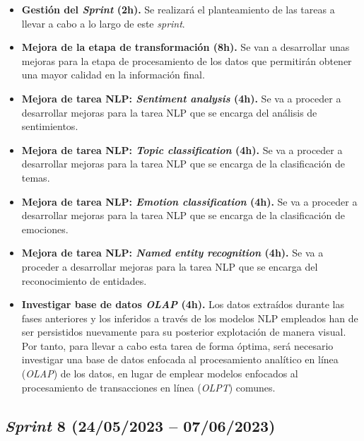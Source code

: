\begin{itemize}

    \item \textbf{Gestión del \textit{Sprint} (2h).} Se realizará el planteamiento de las tareas a llevar a cabo a lo largo de este \textit{sprint}.

    \item \textbf{Mejora de la etapa de transformación (8h).} Se van a desarrollar unas mejoras para la etapa de procesamiento de los datos que permitirán obtener una mayor calidad en la información final.

    \item \textbf{Mejora de tarea NLP: \textit{Sentiment analysis} (4h).} Se va a proceder a desarrollar mejoras para la tarea NLP que se encarga del análisis de sentimientos.

    \item \textbf{Mejora de tarea NLP: \textit{Topic classification} (4h).} Se va a proceder a desarrollar mejoras para la tarea NLP que se encarga de la clasificación de temas.

    \item \textbf{Mejora de tarea NLP: \textit{Emotion classification} (4h).} Se va a proceder a desarrollar mejoras para la tarea NLP que se encarga de la clasificación de emociones.

    \item \textbf{Mejora de tarea NLP: \textit{Named entity recognition} (4h).} Se va a proceder a desarrollar mejoras para la tarea NLP que se encarga del reconocimiento de entidades.

    \item \textbf{Investigar base de datos \textit{OLAP} (4h).} Los datos extraídos durante las fases anteriores y los inferidos a través de los modelos NLP empleados han de ser persistidos nuevamente para su posterior explotación de manera visual. Por tanto, para llevar a cabo esta tarea de forma óptima, será necesario investigar una base de datos enfocada al procesamiento analítico en línea (\textit{OLAP}) de los datos, en lugar de emplear modelos enfocados al procesamiento de transacciones en línea (\textit{OLPT}) comunes.

\end{itemize}

\subsection{\textit{Sprint} 8 (24/05/2023 -- 07/06/2023)}

